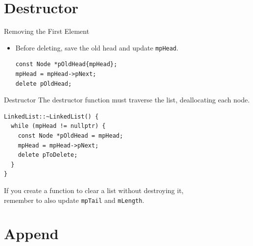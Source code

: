 \documentclass[14pt,aspectratio=1610, hyperref={pdfpagelayout=SinglePage}]{beamer}
\begin{document}
\section{Destructor}

\begin{frame}[fragile]{Removing the First Element}
\begin{itemize}
\item Before deleting, save the old head and update \lstinline{mpHead}.\\
\begin{lstlisting}[basicstyle=\small\ttfamily]
const Node *pOldHead{mpHead};
mpHead = mpHead->pNext;
delete pOldHead;
\end{lstlisting}%
\vspace{1em}
\end{itemize}
\begin{center}
\end{center}
\end{frame}

\begin{frame}[fragile]{Destructor}
The destructor function must traverse the list, deallocating each
node.
\begin{lstlisting}[basicstyle=\small\ttfamily]
LinkedList::~LinkedList() {
  while (mpHead != nullptr) {
    const Node *pOldHead = mpHead;
    mpHead = mpHead->pNext;
    delete pToDelete;
  }
}
\end{lstlisting}
If you create a function to clear a list without destroying it,\\
remember to also update \lstinline{mpTail} and \lstinline{mLength}.
\end{frame}

\section{Append}
\end{document}
